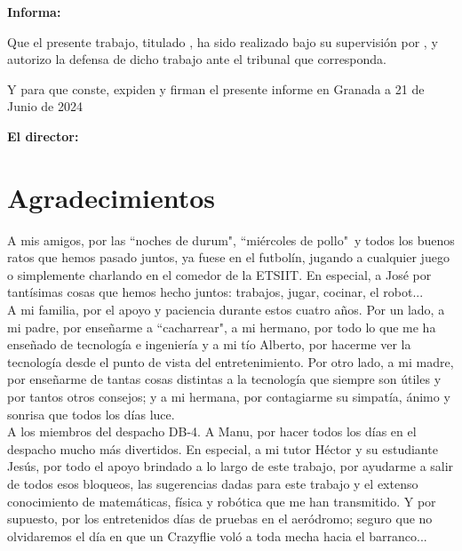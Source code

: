 \textbf{Informa:}

\vspace{0.5cm}

Que el presente trabajo, titulado \textit{\textbf{\myTitle}},
ha sido realizado bajo su supervisión por \textbf{\myName}, y 
autorizo
la defensa de dicho trabajo ante el tribunal que corresponda.

\vspace{0.5cm}

Y para que conste, expiden y firman el presente informe en Granada a 21 de Junio de 2024

\vspace{1cm}

\textbf{El director:}

\vspace{5cm}

\begin{center}
    \noindent \centering \textbf{\myProf}
\end{center}


\chapter*{Agradecimientos}

\thispagestyle{empty}

A mis amigos, por las ``noches de durum", ``miércoles de pollo"\
y todos los buenos ratos que hemos pasado juntos, 
ya fuese en el futbolín, jugando a cualquier juego o simplemente charlando en el comedor de la ETSIIT. 
En especial, a José por tantísimas cosas que hemos hecho juntos: 
trabajos, jugar, cocinar, el robot... \\

A mi familia, por el apoyo y paciencia durante estos cuatro años. 
Por un lado, a mi padre, por enseñarme a ``cacharrear", 
a mi hermano, por todo lo que me ha enseñado de tecnología e ingeniería y 
a mi tío Alberto, por hacerme ver la tecnología desde el punto de vista del entretenimiento.
Por otro lado, a mi madre, por enseñarme de tantas cosas distintas a la tecnología que siempre son útiles y por tantos otros consejos; 
y a mi hermana, por contagiarme su simpatía, ánimo y sonrisa que todos los días luce. \\

A los miembros del despacho DB-4.
A Manu, por hacer todos los días en el despacho mucho más divertidos. 
En especial, a mi tutor Héctor y su estudiante Jesús, por todo el apoyo brindado a lo largo de este trabajo, 
por ayudarme a salir de todos esos bloqueos, las sugerencias dadas para este trabajo y 
el extenso conocimiento de matemáticas, física y robótica que me han transmitido.
Y por supuesto, por los entretenidos días de pruebas en el aeródromo; 
seguro que no olvidaremos el día en que un Crazyflie voló a toda mecha hacia el barranco... \\
